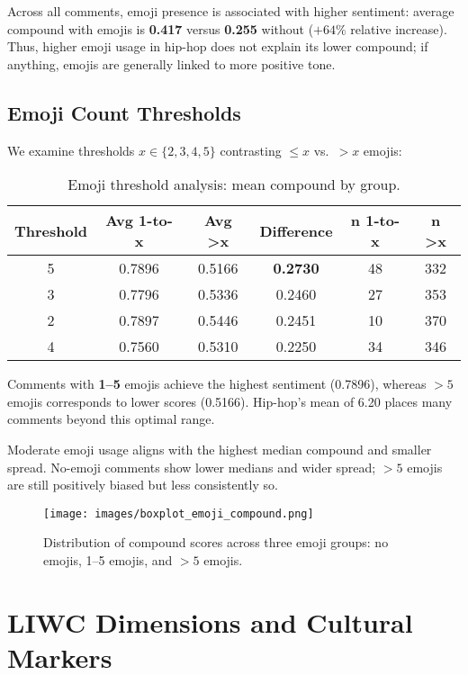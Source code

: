 Across all comments, emoji presence is associated with higher sentiment:
average compound with emojis is \textbf{0.417} versus \textbf{0.255} without
($+64\%$ relative increase). Thus, higher emoji usage in hip-hop does not explain
its lower compound; if anything, emojis are generally linked to more positive tone.

\subsection*{Emoji Count Thresholds}
We examine thresholds $x\in\{2,3,4,5\}$ contrasting $\le x$ vs.\ $>x$ emojis:

\begin{table}[htbp]
\centering
\caption{Emoji threshold analysis: mean compound by group.}
\label{tab:emoji_thresholds}
\begin{tabular}{|c|c|c|c|c|c|}
\hline
\textbf{Threshold} & \textbf{Avg 1-to-x} & \textbf{Avg >x} & \textbf{Difference} & \textbf{n 1-to-x} & \textbf{n >x} \\
\hline
5 & 0.7896 & 0.5166 & \textbf{0.2730} & 48 & 332 \\
3 & 0.7796 & 0.5336 & 0.2460 & 27 & 353 \\
2 & 0.7897 & 0.5446 & 0.2451 & 10 & 370 \\
4 & 0.7560 & 0.5310 & 0.2250 & 34 & 346 \\
\hline
\end{tabular}
\end{table}

Comments with \textbf{1--5} emojis achieve the highest sentiment (0.7896),
whereas $>5$ emojis corresponds to lower scores (0.5166). Hip-hop’s mean of 6.20
places many comments beyond this optimal range.

Moderate emoji usage aligns with the highest median
compound and smaller spread. No-emoji comments show lower medians and wider spread;
$>5$ emojis are still positively biased but less consistently so.


\begin{figure}[H]
    \centering
    \texttt{[image: images/boxplot\_emoji\_compound.png]}
    \caption{Distribution of compound scores across three emoji groups:
    no emojis, 1--5 emojis, and $>5$ emojis.}
    \label{fig:emoji_boxplot}
\end{figure}
\FloatBarrier


\section{LIWC Dimensions and Cultural Markers}
\label{subsec:results_liwc}

